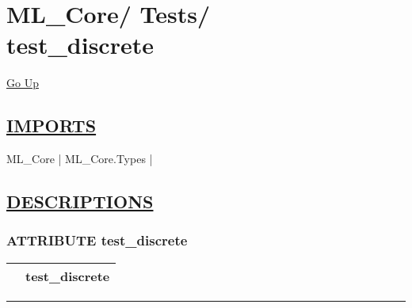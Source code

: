 \chapter*{\color{headfile}
{\large ML\_Core\slash\hspace{0pt}}
{\large Tests\slash\hspace{0pt}}
 \\
test_discrete
}
\hypertarget{ecldoc:toc:ML_Core.Tests.test_discrete}{}
\hyperlink{ecldoc:toc:root/ML_Core/Tests}{Go Up}

\section*{\underline{\textsf{IMPORTS}}}
\begin{doublespace}
{\large
ML\_Core |
ML\_Core.Types |
}
\end{doublespace}

\section*{\underline{\textsf{DESCRIPTIONS}}}
\subsection*{\textsf{\colorbox{headtoc}{\color{white} ATTRIBUTE}
test\_discrete}}

\hypertarget{ecldoc:ml_core.tests.test_discrete}{}

{\renewcommand{\arraystretch}{1.5}
\begin{tabularx}{\textwidth}{|>{\raggedright\arraybackslash}l|X|}
\hline
\hspace{0pt}\mytexttt{\color{red} } & \textbf{test\_discrete} \\
\hline
\end{tabularx}
}

\par


\rule{\linewidth}{0.5pt}
